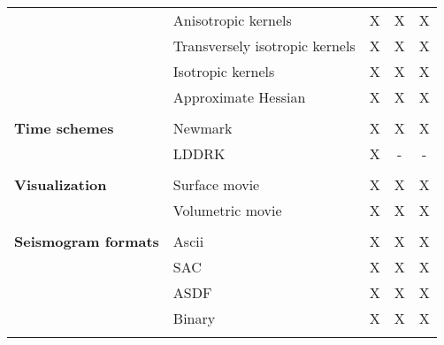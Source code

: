 \begin{table}[htp]
\begin{center}
\begin{tabular}{ l l c c c}
                  & Anisotropic kernels               & X     & X     & X \\
                  & Transversely isotropic kernels    & X     & X     & X \\
                  & Isotropic kernels             & X     & X     & X \\
                  & Approximate Hessian           & X     & X     & X \\
\hline
& & & & \\
{\bf Time schemes}      & Newmark     & X     & X     & X \\
                    & LDDRK     & X     & -     & - \\
\hline
& & & & \\
{\bf Visualization}     & Surface movie   & X     & X     & X \\
                  & Volumetric movie  & X     & X     & X \\
\hline
& & & & \\
{\bf Seismogram formats}  & Ascii           & X   & X   & X \\
                    & SAC       & X & X & X \\
                    & ASDF      & X & X & X \\
                    & Binary      & X & X & X \\
%
\hline
& & & & \\ %
\end{tabular}
\end{center}
\end{table}


